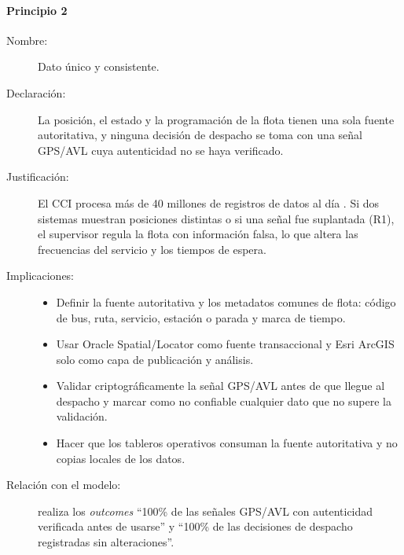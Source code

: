 \paragraph{Principio 2}
\begin{description}
	\item[Nombre:] Dato único y consistente.
	\item[Declaración:] La posición, el estado y la programación de la flota tienen una sola fuente autoritativa, y ninguna decisión de despacho se toma con una señal GPS/AVL cuya autenticidad no se haya verificado.
	\item[Justificación:] El CCI procesa más de 40 millones de registros de datos al día \parencite{transmilenio2026cci}. Si dos sistemas muestran posiciones distintas o si una señal fue suplantada (R1), el supervisor regula la flota con información falsa, lo que altera las frecuencias del servicio y los tiempos de espera.
	\item[Implicaciones:] \hfill
	      \begin{itemize}
		      \item Definir la fuente autoritativa y los metadatos comunes de flota: código de bus, ruta, servicio, estación o parada y marca de tiempo.
		      \item Usar Oracle Spatial/Locator como fuente transaccional y Esri ArcGIS solo como capa de publicación y análisis.
		      \item Validar criptográficamente la señal GPS/AVL antes de que llegue al despacho y marcar como no confiable cualquier dato que no supere la validación.
		      \item Hacer que los tableros operativos consuman la fuente autoritativa y no copias locales de los datos.
	      \end{itemize}
	\item[Relación con el modelo:] realiza los \textit{outcomes} ``100\% de las señales GPS/AVL con autenticidad verificada antes de usarse'' y ``100\% de las decisiones de despacho registradas sin alteraciones''.
\end{description}

